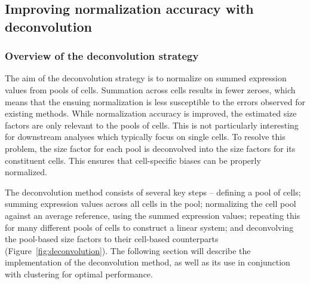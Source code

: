 \documentclass{bmcart}
\begin{document}
\subsection*{Improving normalization accuracy with deconvolution}

\subsubsection*{Overview of the deconvolution strategy}
The aim of the deconvolution strategy is to normalize on summed expression values from pools of cells.
Summation across cells results in fewer zeroes, which means that the ensuing normalization is less susceptible to the errors observed for existing methods.
While normalization accuracy is improved, the estimated size factors are only relevant to the pools of cells.
This is not particularly interesting for downstream analyses which typically focus on single cells.
To resolve this problem, the size factor for each pool is deconvolved into the size factors for its constituent cells.
This ensures that cell-specific biases can be properly normalized.

The deconvolution method consists of several key steps --
    defining a pool of cells;
    summing expression values across all cells in the pool;
    normalizing the cell pool against an average reference, using the summed expression values;
    repeating this for many different pools of cells to construct a linear system;
    and deconvolving the pool-based size factors to their cell-based counterparts (Figure~\ref{fig:deconvolution}).
The following section will describe the implementation of the deconvolution method, as well as its use in conjunction with clustering for optimal performance.
\end{document}
